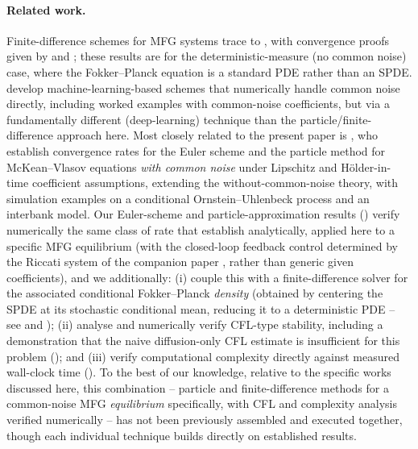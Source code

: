 \documentclass[11pt]{article}
\theoremstyle{remark}
\begin{document}
\paragraph{Related work.} Finite-difference schemes for MFG systems trace to
\citet{achdoucapuzzo2010}, with convergence proofs given by
\citet{achdoucamillicapuzzo2013} and \citet{achdouporretta2016}; these results are
for the deterministic-measure (no common noise) case, where the Fokker--Planck
equation is a standard PDE rather than an SPDE. \citet{carmonalauriere2019}
develop machine-learning-based schemes that numerically handle common noise
directly, including worked examples with common-noise coefficients, but via a
fundamentally different (deep-learning) technique than the particle/finite-difference
approach here. Most closely related to the present paper is
\citet{legall2024}, who establish convergence rates for the Euler scheme and the
particle method for McKean--Vlasov equations \emph{with common noise} under
Lipschitz and H\"older-in-time coefficient assumptions, extending the
without-common-noise theory, with simulation examples on a conditional
Ornstein--Uhlenbeck process and an interbank model. Our Euler-scheme and
particle-approximation results () verify
numerically the same class of rate that \citet{legall2024} establish
analytically, applied here to a specific MFG equilibrium (with the closed-loop
feedback control determined by the Riccati system of the companion paper
\citealp{monyimba2026paper1}, rather than generic given coefficients), and we
additionally: (i) couple this with a finite-difference solver for the associated
conditional Fokker--Planck \emph{density} (obtained by centering the SPDE at its
stochastic conditional mean, reducing it to a deterministic PDE -- see
 and ); (ii) analyse and
numerically verify CFL-type stability, including a demonstration that the
naive diffusion-only CFL estimate is insufficient for this problem
(); and (iii) verify computational complexity directly
against measured wall-clock time (). To the best of our
knowledge, relative to the specific works discussed here, this combination --
particle and finite-difference methods for a common-noise MFG \emph{equilibrium}
specifically, with CFL and complexity analysis verified numerically -- has not
been previously assembled and executed together, though each individual
technique builds directly on established results.
\end{document}
